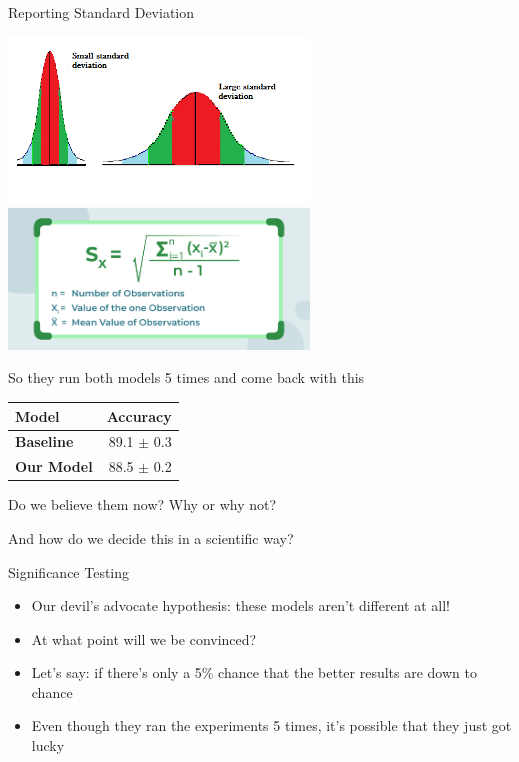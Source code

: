 \begin{vbframe}{Reporting Standard Deviation}

	\includegraphics[width=0.6\textwidth]{evaluation_figures/standard_deviation_curve.png}
	\includegraphics[width=0.6\textwidth]{evaluation_figures/standard_deviation_formula.png} 
	

\vfill

\end{vbframe}


\begin{vbframe}{So they run both models 5 times and come back with this}
	\vfill
	\begin{table}
		\centering
		\begin{tabular}{l|r}
			\textbf{Model} & \textbf{Accuracy} \\
			\hline
			\textbf{Baseline} & 89.1 $\pm$ 0.3 \\
			\textbf{Our Model} & 88.5 $\pm$ 0.2\\
		\end{tabular}
	\end{table}

	\vfill

	Do we believe them now? Why or why not?

	And how do we decide this in a scientific way?
	   
\vfill

\end{vbframe}

\begin{vbframe}{Significance Testing}
	\vfill

	\begin{itemize}
		\item Our devil's advocate hypothesis: these models aren't different at all!
		\item At what point will we be convinced?
		\item Let's say: if there's only a 5\% chance that the better results are down to chance
		\item Even though they ran the experiments 5 times, it's possible that they just got lucky
	\end{itemize}

\end{vbframe}

